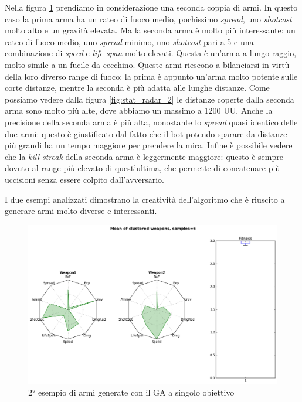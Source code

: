 \documentclass[12pt, italian]{toptesi}
\begin{document}
Nella figura \ref{fig:radar2} prendiamo in considerazione una seconda coppia di armi. In questo caso la prima arma ha un rateo di fuoco medio, pochissimo \emph{spread}, uno \emph{shotcost} molto alto e un gravità elevata. Ma la seconda arma è molto più interessante: un rateo di fuoco medio, uno \emph{spread} minimo, uno \emph{shotcost} pari a 5 e una combinazione di \emph{speed} e \emph{life span} molto elevati. Questa è un'arma a lungo raggio, molto simile a un fucile da cecchino. Queste armi riescono a bilanciarsi in virtù della loro diverso range di fuoco: la prima è appunto un'arma molto potente sulle corte distanze, mentre la seconda è più adatta alle lunghe distanze. 
Come possiamo vedere dalla figura \ref{fig:stat_radar_2} le distanze coperte dalla seconda arma sono molto più alte, dove abbiamo un massimo a 1200 UU. Anche la precisione della seconda arma è più alta, nonostante lo \emph{spread} quasi identico delle due armi: questo è giustificato dal fatto che il bot potendo sparare da distanze più grandi ha un tempo maggiore per prendere la mira. Infine è possibile vedere che la \emph{kill streak} della seconda arma è leggermente maggiore: questo è sempre dovuto al range più elevato di quest'ultima, che permette di concatenare più uccisioni senza essere colpito dall'avversario.

I due esempi analizzati dimostrano la creatività dell'algoritmo che è riuscito a generare armi molto diverse e interessanti.

\begin{figure}[tp]
\centering
\includegraphics[width=1.0\textwidth]{rad_single_obj_2}
\caption{2° esempio di armi generate con il GA a singolo obiettivo}
\label{fig:radar2}
\end{figure}
\end{document}
